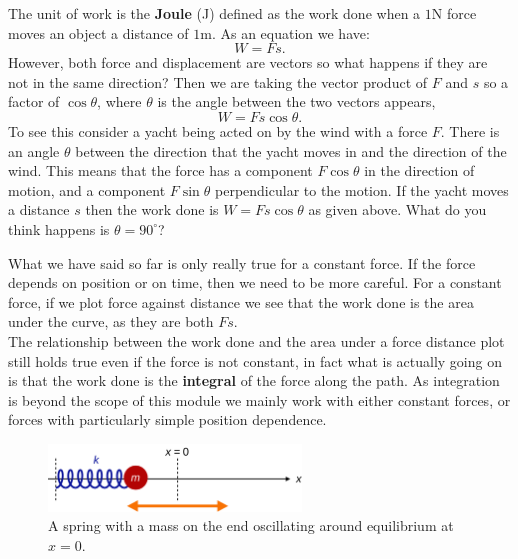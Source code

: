 \documentclass[a4paper,12pt]{book}
\begin{document}
The unit of work is the \textbf{Joule} (J) defined as the work done when a $1$N force moves an object a distance of $1$m. As an equation we have:
\begin{equation*}
W=Fs.
\end{equation*}
However, both force and displacement are vectors so what happens if they are not in the same direction? Then we are taking the vector product of $F$ and $s$ so a factor of $\cos\theta$, where $\theta$ is the angle between the two vectors appears,
\begin{equation*}
W=Fs\cos\theta.
\end{equation*}
To see this consider a yacht being acted on by the wind with a force $F$. There is an angle $\theta$ between the direction that the yacht moves in and the direction of the wind. This means that the force has a component $F\cos\theta$ in the direction of motion, and a component $F\sin\theta$ perpendicular to the motion. If the yacht moves a distance $s$ then the work done is $W=Fs\cos\theta$ as given above.  What do you think happens is $\theta=90^{\circ}$?

What we have said so far is only really true for a constant force. If the force depends on position or on time, then we need to be more careful. For a constant force, if we plot force against distance we see that the work done is the area under the curve, as they are both $Fs$.\\

The relationship between the work done and the area under a force distance plot still holds true even if the force is not constant, in fact what is actually going on is that the work done is the \textbf{integral} of the force along the path. As integration is beyond the scope of this module we mainly work with either constant forces, or forces with particularly simple position dependence.

\begin{figure}[ht]
    \centering
    \includegraphics[width=0.6\textwidth]{figures/SHO_lagrangian_mech.png}
    \caption{A spring with a mass on the end oscillating around equilibrium at $x=0$.}
\end{figure}
\end{document}
